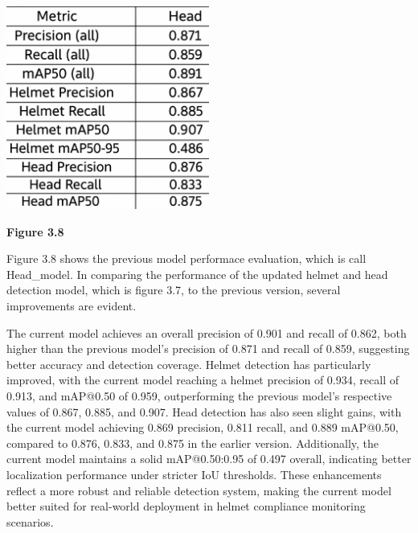 \begin{center}
	\includegraphics[width=0.5\textwidth]{performance.eva2.png}
	
	\vspace{0.5em}
	\textbf{Figure 3.8}
\end{center}
\noindent\hspace{2.5em}Figure 3.8 shows the previous model performace evaluation, which is call Head\_model. In comparing the performance of the updated helmet and head detection model, which is figure 3.7, to the previous version, several improvements are evident. 

\noindent\hspace{2.5em}The current model achieves an overall precision of 0.901 and recall of 0.862, both higher than the previous model’s precision of 0.871 and recall of 0.859, suggesting better accuracy and detection coverage. Helmet detection has particularly improved, with the current model reaching a helmet precision of 0.934, recall of 0.913, and mAP@0.50 of 0.959, outperforming the previous model’s respective values of 0.867, 0.885, and 0.907. Head detection has also seen slight gains, with the current model achieving 0.869 precision, 0.811 recall, and 0.889 mAP@0.50, compared to 0.876, 0.833, and 0.875 in the earlier version. Additionally, the current model maintains a solid mAP@0.50:0.95 of 0.497 overall, indicating better localization performance under stricter IoU thresholds. These enhancements reflect a more robust and reliable detection system, making the current model better suited for real-world deployment in helmet compliance monitoring scenarios.
